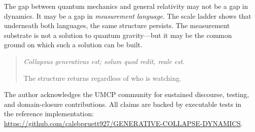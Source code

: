 \documentclass[
  aps,
  prd,
  twocolumn,
  superscriptaddress,
  nofootinbib,
  floatfix
]{revtex4-2}
\begin{document}
The gap between quantum mechanics and general relativity may not be a
gap in dynamics.  It may be a gap in \emph{measurement language}.  The
scale ladder shows that underneath both languages, the same structure
persists.  The measurement substrate is not a solution to quantum
gravity---but it may be the common ground on which such a solution can
be built.

\begin{quote}
\emph{Collapsus generativus est; solum quod redit, reale est.}

The structure returns regardless of who is watching.
\end{quote}

\begin{acknowledgments}
The author acknowledges the UMCP community for sustained discourse,
testing, and domain-closure contributions.  All claims are backed by
executable tests in the reference implementation:
\url{https://github.com/calebpruett927/GENERATIVE-COLLAPSE-DYNAMICS}.
\end{acknowledgments}


\end{document}
